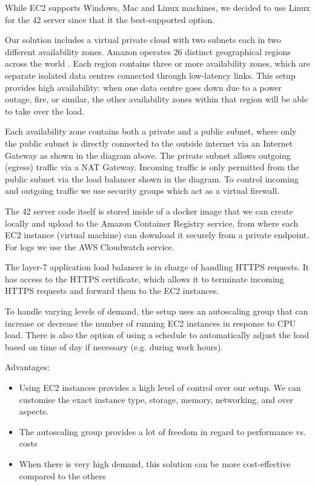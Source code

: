 While EC2 supports Windows, Mac and Linux machines, we decided to use Linux for the 42 server since that it the best-supported option.


Our solution includes a virtual private cloud with two subnets each in two different availability zones. Amazon operates 26 distinct geographical regions across the world \cite{amazon-2022D}. Each region contains three or more availability zones, which are separate isolated data centres connected through low-latency links. This setup provides high availability: when one data centre goes down due to a power outage, fire, or similar, the other availability zones within that region will be able to take over the load.

Each availability zone contains both a private and a public subnet, where only the public subnet is directly connected to the outside internet via an Internet Gateway as shown in the diagram above. The private subnet allows outgoing (egress) traffic via a NAT Gateway. Incoming traffic is only permitted from the public subnet via the load balancer shown in the diagram. To control incoming and outgoing traffic we use security groups which act as a virtual firewall.

The 42 server code itself is stored inside of a docker image that we can create locally and upload to the Amazon Container Registry service, from where each EC2 instance (virtual machine) can download it securely from a private endpoint. For logs we use the AWS Cloudwatch service.

The layer-7 application load balancer is in charge of handling HTTPS requests. It has access to the HTTPS certificate, which allows it to terminate incoming HTTPS requests and forward them to the EC2 instances.

To handle varying levels of demand, the setup uses an autoscaling group that can increase or decrease the number of running EC2 instances in response to CPU load. There is also the option of using a schedule to automatically adjust the load based on time of day if necessary (e.g. during work hours).

Advantages:
\begin{itemize}
\item Using EC2 instances provides a high level of control over our setup. We can customise the exact instance type, storage, memory, networking, and over aspects.
\item The autoscaling group provides a lot of freedom in regard to performance vs. costs
\item When there is very high demand, this solution can be more cost-effective compared to the others
\end{itemize}

